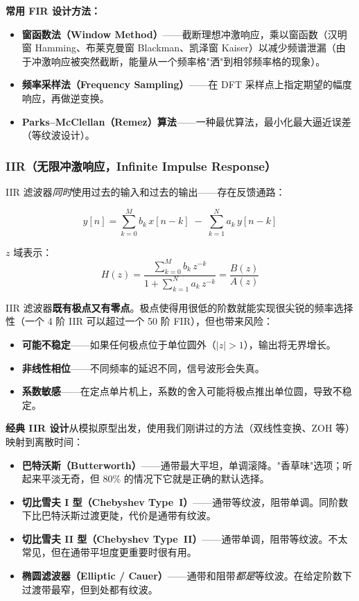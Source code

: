 \textbf{常用 FIR 设计方法：}
\begin{itemize}
    \item \textbf{窗函数法（Window Method）}——截断理想冲激响应，乘以窗函数（汉明窗 Hamming、布莱克曼窗 Blackman、凯泽窗 Kaiser）以减少频谱泄漏（由于冲激响应被突然截断，能量从一个频率格"洒"到相邻频率格的现象）。
    \item \textbf{频率采样法（Frequency Sampling）}——在 DFT 采样点上指定期望的幅度响应，再做逆变换。
    \item \textbf{Parks--McClellan（Remez）算法}——一种最优算法，最小化最大逼近误差（等纹波设计）。
\end{itemize}

\subsubsection{IIR（无限冲激响应，Infinite Impulse Response）}

IIR 滤波器\textit{同时}使用过去的输入和过去的输出——存在反馈通路：

\begin{equation}
y[n] = \sum_{k=0}^{M} b_k \, x[n-k] \;-\; \sum_{k=1}^{N} a_k \, y[n-k]
\end{equation}

$z$ 域表示：
\begin{equation}
H(z) = \frac{\displaystyle\sum_{k=0}^{M} b_k \, z^{-k}}
            {1 + \displaystyle\sum_{k=1}^{N} a_k \, z^{-k}}
     = \frac{B(z)}{A(z)}
\end{equation}

IIR 滤波器\textbf{既有极点又有零点}。极点使得用很低的阶数就能实现很尖锐的频率选择性（一个 4 阶 IIR 可以超过一个 50 阶 FIR），但也带来风险：
\begin{itemize}
    \item \textbf{可能不稳定}——如果任何极点位于单位圆外（$|z| > 1$），输出将无界增长。
    \item \textbf{非线性相位}——不同频率的延迟不同，信号波形会失真。
    \item \textbf{系数敏感}——在定点单片机上，系数的舍入可能将极点推出单位圆，导致不稳定。
\end{itemize}

\textbf{经典 IIR 设计}从模拟原型出发，使用我们刚讲过的方法（双线性变换、ZOH 等）映射到离散时间：
\begin{itemize}
    \item \textbf{巴特沃斯（Butterworth）}——通带最大平坦，单调滚降。"香草味"选项；听起来平淡无奇，但 80\% 的情况下它就是正确的默认选择。
    \item \textbf{切比雪夫 I 型（Chebyshev Type~I）}——通带等纹波，阻带单调。同阶数下比巴特沃斯过渡更陡，代价是通带有纹波。
    \item \textbf{切比雪夫 II 型（Chebyshev Type~II）}——通带单调，阻带等纹波。不太常见，但在通带平坦度更重要时很有用。
    \item \textbf{椭圆滤波器（Elliptic / Cauer）}——通带和阻带\textit{都是}等纹波。在给定阶数下过渡带最窄，但到处都有纹波。
\end{itemize}

